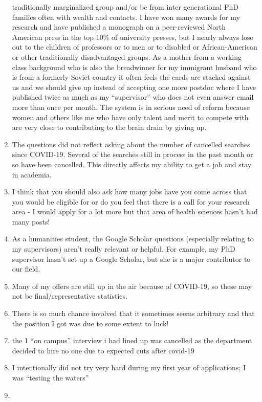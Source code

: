 \documentclass[]{article}
\begin{document}
\begin{enumerate}
  traditionally marginalized group and/or be from inter generational PhD
  families often with wealth and contacts. I have won many awards for my
  research and have published a monograph on a peer-reviewed North
  American press in the top 10\% of university presses, but I nearly
  always lose out to the children of professors or to men or to disabled
  or African-American or other traditionally disadvantaged groups. As a
  mother from a working class background who is also the breadwinner for
  my immigrant husband who is from a formerly Soviet country it often
  feels the cards are stacked against us and we should give up instead
  of accepting one more postdoc where I have published twice as much as
  my ``supervisor'' who does not even answer email more than once per
  month. The system is in serious need of reform because women and
  others like me who have only talent and merit to compete with are very
  close to contributing to the brain drain by giving up.
\item
  The questions did not reflect asking about the number of cancelled
  searches since COVID-19. Several of the searches still in process in
  the past month or so have been cancelled. This directly affects my
  ability to get a job and stay in academia.
\item
  I think that you should also ask how many jobs have you come across
  that you would be eligible for or do you feel that there is a call for
  your research area - I would apply for a lot more but that area of
  health sciences hasn't had many posts!
\item
  As a humanities student, the Google Scholar questions (especially
  relating to my supervisors) aren't really relevant or helpful. For
  example, my PhD supervisor hasn't set up a Google Scholar, but she is
  a major contributor to our field.
\item
  Many of my offers are still up in the air because of COVID-19, so
  these may not be final/representative statistics.
\item
  There is so much chance involved that it sometimes seems arbitrary and
  that the position I got was due to some extent to luck!
\item
  the 1 ``on campus'' interview i had lined up was cancelled as the
  department decided to hire no one due to expected cuts after covid-19
\item
  I intentionally did not try very hard during my first year of
  applications; I was ``testing the waters''
\item

\end{enumerate}
\end{document}
